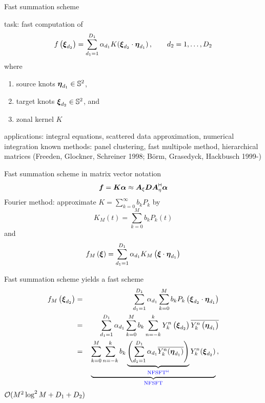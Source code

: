 \newpage
\hypertarget{fastsumS2}{}
{\color{blue} Fast summation scheme}
\vfill

task: fast computation of 
\begin{equation*}
  f\left(\mbox{\boldmath $\xi$}_{d_2}\right) = \sum_{d_1=1}^{D_1} \alpha_{d_1} K(\mbox{\boldmath $\xi$}_{d_2}\cdot \mbox{\boldmath $\eta$}_{d_1})\,, \qquad d_2 =1,\ldots,D_2
\end{equation*}
where
\begin{enumerate}
\item source knots $\mbox{\boldmath $\eta$}_{d_1} \in \mathbb{S}^2$,
\item target knots $\mbox{\boldmath $\xi$}_{d_2} \in \mathbb{S}^2$, and
\item zonal kernel $K$
\end{enumerate}
\vfill
applications: integral equations, scattered data approximation, numerical
integration
\vfill
known methods: panel clustering, fast multipole method, hierarchical matrices
{\tiny (Freeden, Glockner, Schreiner 1998; B\"orm, Grasedyck, Hackbusch 1999-)}

\vfill

\newpage
\hypertarget{fastsumS2}{}
{\color{blue} Fast summation scheme}
\vfill
in matrix vector notation 
\begin{equation*}
  \mbox{\boldmath $f$}=\mbox{\boldmath $K$} \mbox{\boldmath $\alpha$} \approx \mbox{\boldmath $A$}_{\xi} \mbox{\boldmath $D$} \mbox{\boldmath $A$}^{{\vdash \hspace*{-1.72mm} \dashv}}_{\eta} \mbox{\boldmath $\alpha$}
\end{equation*}
\vfill
Fourier method: approximate $K=\sum_{k=0}^{\infty} b_k P_k$ by
\begin{equation*}
  K_M\left(t\right)=\sum_{k=0}^M b_k P_k\left(t\right)
\end{equation*}
\vfill
and
\begin{equation*}
  f_M\left(\mbox{\boldmath $\xi$}\right) =  \sum_{d_1=1}^{D_1} \alpha_{d_1} K_M
  \left(\mbox{\boldmath $\xi$} \cdot \mbox{\boldmath $\eta$}_{d_1}\right)
\end{equation*}
\vfill

\newpage
\hypertarget{fastsumS2}{}
{\color{blue} Fast summation scheme}
\vfill
yields a fast scheme
\begin{eqnarray*}
  f_M \left(\mbox{\boldmath $\xi$}_{d_2}\right)
  &=& 
  \sum_{d_1=1}^{D_1} \alpha_{d_1} \sum_{k=0}^M b_{k} 
  P_k \left(\mbox{\boldmath $\xi$}_{d_2} \cdot \mbox{\boldmath $\eta$}_{d_1}\right)
  \\ &=& 
  \sum_{d_1=1}^{D_1} \alpha_{d_1}  \sum_{k=0}^M b_{k} \sum_{n=-k}^{k}
  Y_k^n\left(\mbox{\boldmath $\xi$}_{d_2}\right) \overline{Y_k^n\left(\mbox{\boldmath $\eta$}_{d_1}\right)}
  \\ &=& 
  \,\underbrace{
    \sum_{k=0}^M  \sum_{n=-k}^{k} b_{k}
    \underbrace{\left( \sum_{d_1=1}^{D_1}  \alpha_{d_1}  \overline{Y_k^n( \mbox{\boldmath $\eta$}_{d_1})} \right)}_{\color{blue} {\rm NFSFT}^{{\vdash \hspace*{-1.72mm} \dashv}}} 
    Y_k^n(\mbox{\boldmath $\xi$}_{d_2})}_{\color{blue} \rm NFSFT}\,,
\end{eqnarray*}
${\cal O}( M^2 \log^2 M + D_1+D_2)$
\vfill



